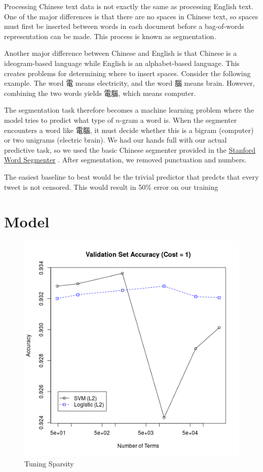 \documentclass{sig-alternate-05-2015}
\begin{document}
Processing Chinese text data is not exactly the same as processing English text. One of the major differences is that there are no spaces in Chinese text, so spaces must first be inserted between words in each document before a bag-of-words representation can be made. This process is known as segmentation. 

Another major difference between Chinese and English is that Chinese is a ideogram-based language while English is an alphabet-based language. This creates problems for determining where to insert spaces. Consider the following example. The word 電 means electricity, and the word 腦 means brain. However, combining the two words yields 電腦, which means computer.

The segmentation task therefore becomes a machine learning problem where the model tries to predict what type of $n$-gram a word is. When the segmenter encounters a word like 電腦, it must decide whether this is a bigram (computer) or two unigrams (electric brain). We had our hands full with our actual predictive task, so we used the basic Chinese segmenter provided in the \href{http://nlp.stanford.edu/software/segmenter.shtml}{Stanford Word Segmenter} \cite{Chang2008}. After segmentation, we removed punctuation and numbers.

The easiest baseline to beat would be the trivial predictor that predcts that every tweet is not censored. This would result in 50\% error on our training

\section{Model}
\begin{figure}
  \centering
  \includegraphics[scale=0.5]{valid_numTerms.png}
  \caption{Tuning Sparsity}
  \label{fig:sparse}
\end{figure}
\end{document}
